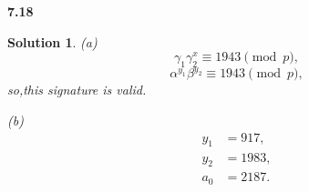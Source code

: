 \documentclass[12pt,a4paper]{article}
\theoremstyle{solution}
\newtheorem*{sol}{Solution}
\begin{document}
\textbf{7.18}

\begin{sol}
(a)
$$\gamma_1\gamma_2 ^x \equiv 1943 \pmod{p},$$
$$\alpha^{y_1}\beta^{y_2} \equiv 1943 \pmod{p},$$
so,this signature is valid.

(b)
\begin{align*}
y_1&=917, \\
y_2&=1983, \\
a_0&=2187.\\
\end{align*}
\end{sol}
\end{document}
